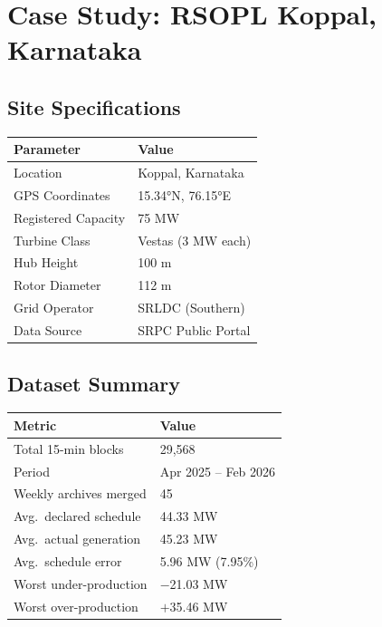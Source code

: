 \documentclass[11pt,a4paper]{article}
\begin{document}
\section{Case Study: RSOPL Koppal, Karnataka}

\begin{minipage}[t]{0.48\linewidth}
  \subsection*{Site Specifications}
  \begin{tabular}{@{}ll@{}}
    \toprule
    \textbf{Parameter}      & \textbf{Value} \\
    \midrule
    Location                & Koppal, Karnataka \\
    GPS Coordinates         & 15.34°N, 76.15°E \\
    Registered Capacity     & 75 MW \\
    Turbine Class           & Vestas (3 MW each) \\
    Hub Height              & 100 m \\
    Rotor Diameter          & 112 m \\
    Grid Operator           & SRLDC (Southern) \\
    Data Source             & SRPC Public Portal \\
    \bottomrule
  \end{tabular}
\end{minipage}
\hfill
\begin{minipage}[t]{0.48\linewidth}
  \subsection*{Dataset Summary}
  \begin{tabular}{@{}ll@{}}
    \toprule
    \textbf{Metric}         & \textbf{Value} \\
    \midrule
    Total 15-min blocks     & 29,568 \\
    Period                  & Apr 2025 -- Feb 2026 \\
    Weekly archives merged  & 45 \\
    Avg.\ declared schedule & 44.33 MW \\
    Avg.\ actual generation & 45.23 MW \\
    Avg.\ schedule error    & 5.96 MW (7.95\%) \\
    Worst under-production  & $-$21.03 MW \\
    Worst over-production   & $+$35.46 MW \\
    \bottomrule
  \end{tabular}
\end{minipage}
\end{document}
